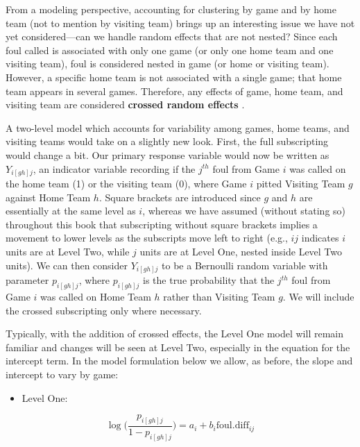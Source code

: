 \documentclass[
]{krantz}
\providecommand{\tightlist}{%
  \setlength{\itemsep}{0pt}\setlength{\parskip}{0pt}}
\begin{document}
From a modeling perspective, accounting for clustering by game and by home team (not to mention by visiting team) brings up an interesting issue we have not yet considered---can we handle random effects that are not nested? Since each foul called is associated with only one game (or only one home team and one visiting team), foul is considered nested in game (or home or visiting team). However, a specific home team is not associated with a single game; that home team appears in several games. Therefore, any effects of game, home team, and visiting team are considered \textbf{crossed random effects} .

A two-level model which accounts for variability among games, home teams, and visiting teams would take on a slightly new look. First, the full subscripting would change a bit. Our primary response variable would now be written as \(Y_{i[gh]j}\), an indicator variable recording if the \(j^{th}\) foul from Game \(i\) was called on the home team (1) or the visiting team (0), where Game \(i\) pitted Visiting Team \(g\) against Home Team \(h\). Square brackets are introduced since \(g\) and \(h\) are essentially at the same level as \(i\), whereas we have assumed (without stating so) throughout this book that subscripting without square brackets implies a movement to lower levels as the subscripts move left to right (e.g., \(ij\) indicates \(i\) units are at Level Two, while \(j\) units are at Level One, nested inside Level Two units). We can then consider \(Y_{i[gh]j}\) to be a Bernoulli random variable with parameter \(p_{i[gh]j}\), where \(p_{i[gh]j}\) is the true probability that the \(j^{th}\) foul from Game \(i\) was called on Home Team \(h\) rather than Visiting Team \(g\). We will include the crossed subscripting only where necessary.

Typically, with the addition of crossed effects, the Level One model will remain familiar and changes will be seen at Level Two, especially in the equation for the intercept term. In the model formulation below we allow, as before, the slope and intercept to vary by game:

\begin{itemize}
\tightlist
\item
  Level One:
\end{itemize}

\begin{equation}
\log\bigg(\frac{p_{i[gh]j}}{1-p_{i[gh]j}}\bigg)=a_{i}+b_{i}\mathrm{foul.diff}_{ij}
\label{eq:lev1cross} 
\end{equation}
\end{document}
